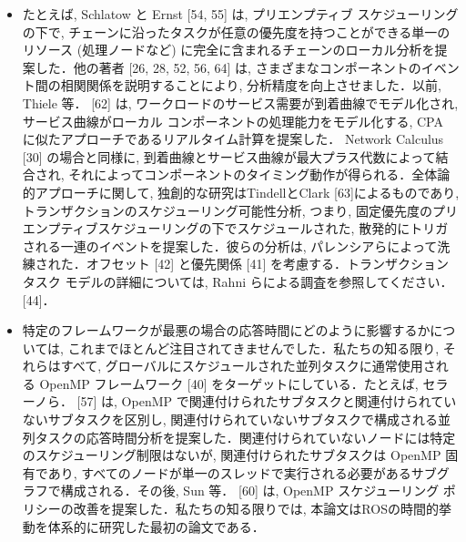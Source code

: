 \begin{frame}{}
    \begin{itemize}
        \item たとえば, Schlatow と Ernst [54, 55] は, プリエンプティブ スケジューリングの下で, チェーンに沿ったタスクが任意の優先度を持つことができる単一のリソース (処理ノードなど) に完全に含まれるチェーンのローカル分析を提案した．他の著者 [26, 28, 52, 56, 64] は, さまざまなコンポーネントのイベント間の相関関係を説明することにより, 分析精度を向上させました．以前, Thiele 等． [62] は, ワークロードのサービス需要が到着曲線でモデル化され, サービス曲線がローカル コンポーネントの処理能力をモデル化する, CPA に似たアプローチであるリアルタイム計算を提案した． Network Calculus [30] の場合と同様に, 到着曲線とサービス曲線が最大プラス代数によって結合され, それによってコンポーネントのタイミング動作が得られる．全体論的アプローチに関して, 独創的な研究はTindellとClark [63]によるものであり, トランザクションのスケジューリング可能性分析, つまり, 固定優先度のプリエンプティブスケジューリングの下でスケジュールされた, 散発的にトリガされる一連のイベントを提案した．彼らの分析は, パレンシアらによって洗練された．オフセット [42] と優先関係 [41] を考慮する．トランザクション タスク モデルの詳細については, Rahni らによる調査を参照してください． [44]．
    \end{itemize}
\end{frame}

\begin{frame}{}
    \begin{itemize}
        \item 特定のフレームワークが最悪の場合の応答時間にどのように影響するかについては, これまでほとんど注目されてきませんでした．私たちの知る限り, それらはすべて, グローバルにスケジュールされた並列タスクに通常使用される OpenMP フレームワーク [40] をターゲットにしている．たとえば, セラーノら． [57] は, OpenMP で関連付けられたサブタスクと関連付けられていないサブタスクを区別し, 関連付けられていないサブタスクで構成される並列タスクの応答時間分析を提案した．関連付けられていないノードには特定のスケジューリング制限はないが, 関連付けられたサブタスクは OpenMP 固有であり, すべてのノードが単一のスレッドで実行される必要があるサブグラフで構成される．その後, Sun 等． [60] は, OpenMP スケジューリング ポリシーの改善を提案した．私たちの知る限りでは, 本論文はROSの時間的挙動を体系的に研究した最初の論文である．
    \end{itemize}
\end{frame}
